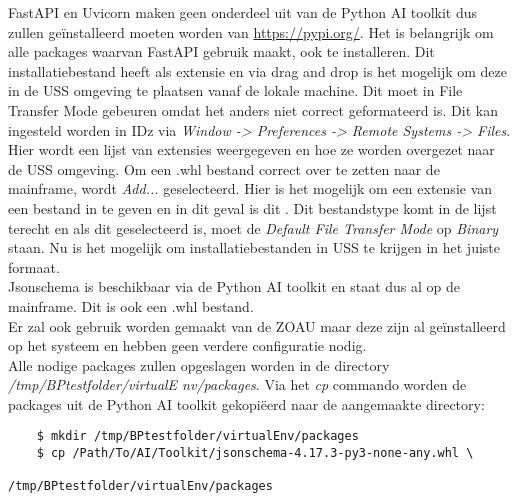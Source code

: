 FastAPI en Uvicorn maken geen onderdeel uit van de Python AI toolkit dus zullen geïnstalleerd moeten worden van \url{https://pypi.org/}. Het is belangrijk om alle packages waarvan FastAPI gebruik maakt, ook te installeren. Dit installatiebestand heeft als extensie  en via drag and drop is het mogelijk om deze in de USS omgeving te plaatsen vanaf de lokale machine. Dit moet in File Transfer Mode  gebeuren omdat het anders niet correct geformateerd is. Dit kan ingesteld worden in IDz via \textit{Window -> Preferences -> Remote Systems -> Files}. Hier wordt een lijst van extensies weergegeven en hoe ze worden overgezet naar de USS omgeving. Om een .whl bestand correct over te zetten naar de mainframe, wordt \textit{Add...} geselecteerd. Hier is het mogelijk om een extensie van een bestand in te geven en in dit geval is dit . Dit bestandstype komt in de lijst terecht en als dit geselecteerd is, moet de \textit{Default File Transfer Mode} op \textit{Binary} staan. Nu is het mogelijk om installatiebestanden in USS te krijgen in het juiste formaat. \\

Jsonschema is beschikbaar via de Python AI toolkit en staat dus al op de mainframe. Dit is ook een .whl bestand. \\

Er zal ook gebruik worden gemaakt van de ZOAU maar deze zijn al geïnstalleerd op het systeem en hebben geen verdere configuratie nodig. \\

Alle nodige packages zullen opgeslagen worden in de directory \textit{/tmp/BPtestfolder/virtualE nv/packages}. Via het \textit{cp} commando worden de packages uit de Python AI toolkit gekopiëerd naar de aangemaakte directory: \\

\begin{lstlisting}
    $ mkdir /tmp/BPtestfolder/virtualEnv/packages
    $ cp /Path/To/AI/Toolkit/jsonschema-4.17.3-py3-none-any.whl \
                                         /tmp/BPtestfolder/virtualEnv/packages
\end{lstlisting} 


